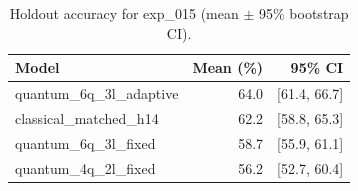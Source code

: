 \begin{table}[ht]
\centering
\caption{Holdout accuracy for exp_015 (mean $\pm$ 95\% bootstrap CI).}
\label{tab:exp_015}
\begin{tabular}{lrr}
\toprule
Model & Mean (\%) & 95\% CI \\
\midrule
quantum\_6q\_3l\_adaptive & 64.0 & [61.4, 66.7] \\
classical\_matched\_h14 & 62.2 & [58.8, 65.3] \\
quantum\_6q\_3l\_fixed & 58.7 & [55.9, 61.1] \\
quantum\_4q\_2l\_fixed & 56.2 & [52.7, 60.4] \\
\bottomrule
\end{tabular}
\end{table}
